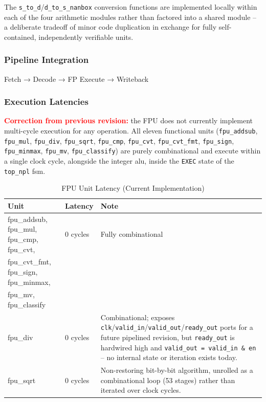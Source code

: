 The \texttt{s\_to\_d}/\texttt{d\_to\_s\_nanbox} conversion functions are
implemented locally within each of the four arithmetic modules rather than
factored into a shared module -- a deliberate tradeoff of minor code
duplication in exchange for fully self-contained, independently verifiable
units.

\subsubsection{Pipeline Integration}
Fetch → Decode → FP Execute → Writeback

\subsubsection{Execution Latencies}
\textcolor{red}{\textbf{Correction from previous revision:}} the FPU does
not currently implement multi-cycle execution for any operation. All
eleven functional units (\texttt{fpu\_addsub}, \texttt{fpu\_mul},
\texttt{fpu\_div}, \texttt{fpu\_sqrt}, \texttt{fpu\_cmp}, \texttt{fpu\_cvt},
\texttt{fpu\_cvt\_fmt}, \texttt{fpu\_sign}, \texttt{fpu\_minmax},
\texttt{fpu\_mv}, \texttt{fpu\_classify}) are purely combinational and
execute within a single clock cycle, alongside the integer \gls{alu}, inside
the \texttt{EXEC} state of the \texttt{top\_npl} \gls{fsm}.

\begin{table}[H]
\centering
\caption{FPU Unit Latency (Current Implementation)}
\begin{tabular}{|l|l|l|}
\hline
\textbf{Unit} & \textbf{Latency} & \textbf{Note} \\ \hline
fpu\_addsub, fpu\_mul, fpu\_cmp, fpu\_cvt, & 0 cycles & Fully combinational \\
fpu\_cvt\_fmt, fpu\_sign, fpu\_minmax, & & \\
fpu\_mv, fpu\_classify & & \\ \hline
fpu\_div & 0 cycles & Combinational; exposes
\texttt{clk}/\texttt{valid\_in}/\texttt{valid\_out}/\texttt{ready\_out}
ports for a future pipelined revision, but \texttt{ready\_out} is hardwired
high and \texttt{valid\_out = valid\_in \& en} -- no internal state or
iteration exists today. \\ \hline
fpu\_sqrt & 0 cycles & Non-restoring bit-by-bit algorithm, unrolled as a
combinational loop (53 stages) rather than iterated over clock cycles. \\
\hline
\end{tabular}
\end{table}


